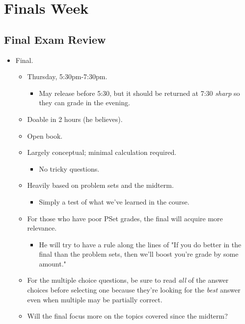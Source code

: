 \documentclass[../notes.tex]{subfiles}
\begin{document}
\chapter{Finals Week}
\section{Final Exam Review}
\begin{itemize}
    \item {}Final.
    \begin{itemize}
        \item Thursday, 5:30pm-7:30pm.
        \begin{itemize}
            \item May release before 5:30, but it should be returned at 7:30 \emph{sharp} so they can grade in the evening.
        \end{itemize}
        \item Doable in 2 hours (he believes).
        \item Open book.
        \item Largely conceptual; minimal calculation required.
        \begin{itemize}
            \item No tricky questions.
        \end{itemize}
        \item Heavily based on problem sets and the midterm.
        \begin{itemize}
            \item Simply a test of what we've learned in the course.
        \end{itemize}
        \item For those who have poor PSet grades, the final will acquire more relevance.
        \begin{itemize}
            \item He will try to have a rule along the lines of "If you do better in the final than the problem sets, then we'll boost you're grade by some amount."
        \end{itemize}
        \item For the multiple choice questions, be sure to read \emph{all} of the answer choices before selecting one because they're looking for the \emph{best} answer even when multiple may be partially correct.
        \item Will the final focus more on the topics covered since the midterm?
    \end{itemize}

\end{itemize}
\end{document}
